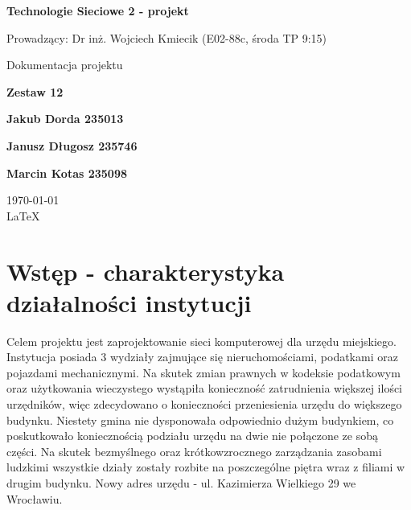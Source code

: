 \documentclass[12pt,a4paper]{article}
\begin{document}
	
	\begin{titlepage}
		
		\centering
		{\huge\bfseries Technologie Sieciowe 2 - projekt\par}
		
		\vspace{0.5cm}
		Prowadzący: Dr inż. Wojciech Kmiecik (E02-88c, środa TP 9:15) \\
	
		\vspace{1.1cm}
		{\Large Dokumentacja projektu\par}
		\vspace{1.1cm}
		{\Large \bfseries Zestaw 12\par}
		\vfill
		
		{\large\bfseries Jakub Dorda 235013\par}
		{\large\bfseries Janusz Długosz 235746\par}
		{\large\bfseries Marcin Kotas 235098\par}
		
		\vspace{1cm}
		\today \\ \LaTeX
		
		\restoregeometry
	\end{titlepage}
	
	
	\tableofcontents
	\pagebreak
	
	\section{Wstęp - charakterystyka działalności instytucji}
	
	Celem projektu jest zaprojektowanie sieci komputerowej dla urzędu miejskiego. Instytucja posiada 3 wydziały zajmujące się	nieruchomościami, podatkami oraz pojazdami mechanicznymi. Na skutek zmian prawnych w kodeksie podatkowym oraz użytkowania wieczystego wystąpiła konieczność zatrudnienia większej ilości urzędników, więc zdecydowano o konieczności przeniesienia urzędu do większego budynku. Niestety gmina nie dysponowała odpowiednio dużym budynkiem, co poskutkowało koniecznością podziału urzędu na dwie nie połączone ze sobą części. Na skutek bezmyślnego oraz krótkowzrocznego zarządzania zasobami ludzkimi wszystkie działy zostały rozbite na poszczególne piętra wraz z filiami w drugim budynku. Nowy adres urzędu - ul. Kazimierza Wielkiego 29 we Wrocławiu.\\
	
\end{document}
